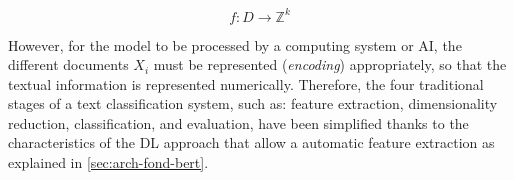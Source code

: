 \documentclass[onecolumn, journal, english, 12pt, a4paper]{IEEEtran} %
\DeclareMathOperator{\Tokenize}{Tokenize}
\theoremstyle{definition}
\begin{document}
\begin{equation}\label{eq:clasificacion}
    f: D \longrightarrow \mathbb{Z}^k
\end{equation}

However, for the model to be processed by a computing system or AI,
the different documents $X_i$ must be represented (\emph{encoding})
appropriately, so that the textual information is represented
numerically. Therefore, the four traditional stages of a text
classification system, such as: feature extraction, dimensionality
reduction, classification, and evaluation, have been simplified thanks
to the characteristics of the DL approach that allow a automatic
feature extraction as explained in \ref{sec:arch-fond-bert}.




\end{document}
